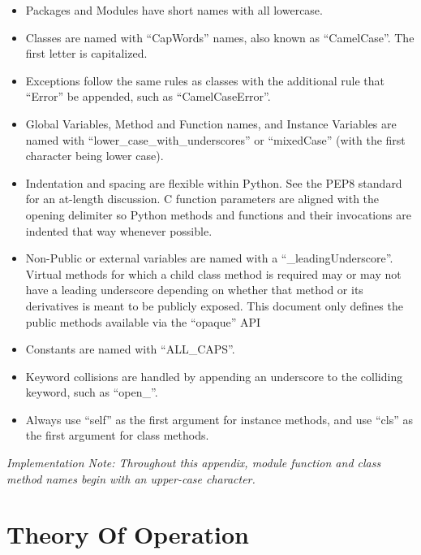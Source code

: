 \documentclass[12pt]{report} %
\begin{document}
\begin{appendices}
\begin{itemize}[noitemsep,nolistsep]
\item{Packages and Modules have short names with all lowercase.}

\item{Classes are named with ``CapWords'' names, also known as
``CamelCase''. The first letter is capitalized.}

\item{Exceptions follow the same rules as classes with the additional
rule that ``Error'' be appended, such as ``CamelCaseError''.}

\item{Global Variables, Method and Function names, and Instance Variables
are named with ``lower_case_with_underscores'' or ``mixedCase'' (with the
first character being lower case).}

\item{Indentation and spacing are flexible within Python. See the PEP8 standard
for an at-length discussion. C function parameters are aligned with the opening
delimiter so Python methods and functions and their invocations are indented
that way whenever possible.}

\item{Non-Public or external variables are named with a
``_leadingUnderscore''. Virtual methods for which a child class method is
required may or may not have a leading underscore depending on whether that
method or its derivatives is meant to be publicly exposed. This document only
defines the public methods available via the ``opaque'' API}

\item{Constants are named with ``ALL_CAPS''.}

\item{Keyword collisions are handled by appending an underscore to the
colliding keyword, such as ``open_''.}

\item{Always use ``self'' as the first argument for instance methods, and use
``cls'' as the first argument for class methods.}

\end{itemize}

\emph{Implementation Note: Throughout this appendix, module function and class
method names begin with an upper-case character.}



\section{Theory Of Operation}\label{sec:PythonTheoryOfOperation}

\end{appendices}
\end{document}
